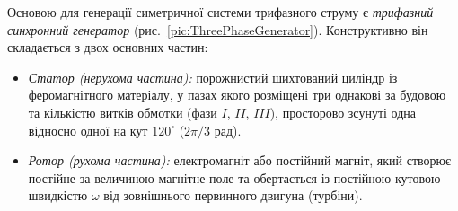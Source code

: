 \documentclass[]{ConspectBook}
\begin{document}
Основою для генерації симетричної системи трифазного струму є \emph{трифазний синхронний генератор} (рис.~\ref{pic:ThreePhaseGenerator}). Конструктивно він складається з двох основних частин:
\begin{itemize}
    \item \emph{Статор (нерухома частина):} порожнистий шихтований циліндр із феромагнітного матеріалу, у пазах якого розміщені три однакові за будовою та кількістю витків обмотки (фази $I$, $II$, $III$), просторово зсунуті одна відносно одної на кут $120^\circ$ ($2\pi/3$ рад).
    \item \emph{Ротор (рухома частина):} електромагніт або постійний магніт, який створює постійне за величиною магнітне поле та обертається із постійною кутовою швидкістю $\omega$ від зовнішнього первинного двигуна (турбіни).
\end{itemize}
\end{document}
